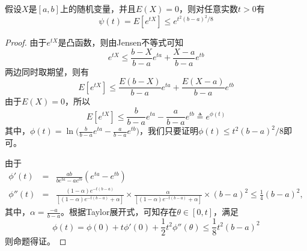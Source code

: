 \begin{lemma}[Hoeffding法则]
假设$X$是$[a,b]$上的随机变量，并且$E(X)=0$，则对任意实数$t>0$有
\begin{equation}
   \psi(t) = E[e^{tX}] \le e^{t^2(b-a)^2/8}
\end{equation}
\end{lemma}
\begin{proof}
由于$e^{tX}$是凸函数，则由Jensen不等式可知
\begin{equation}
  e^{tX} \le \frac{b-X}{b-a} e^{ta} + \frac{X-a}{b-a} e^{tb}
\end{equation}
两边同时取期望，则有
\begin{equation}
  E[e^{tX}] \le \frac{E(b-X)}{b-a} e^{ta} + \frac{E(X-a)}{b-a} e^{tb}
\end{equation}
由于$E(X)=0$，所以
\begin{equation}
  E[e^{tX}] \le \frac{b}{b-a} e^{ta} - \frac{a}{b-a} e^{tb} \triangleq e^{\phi(t)}
\end{equation}
其中，$\phi(t)=\ln\big(\frac{b}{b-a} e^{ta} - \frac{a}{b-a} e^{tb}\big)$，我们只要证明$\phi(t)\le t^2(b-a)^2/8$即可。

由于
\begin{eqnarray}
    \phi'(t) &=& \frac{ab}{b e^{ta} - a e^{tb}} (e^{ta} - e^{tb}) \\
    \phi''(t) &=& \frac{(1-\alpha) e^{-t(b-a)}}{[(1-\alpha) e^{-t(b-a)} + \alpha]} \times \frac{\alpha}{[(1-\alpha) e^{-t(b-a)} + \alpha]} \times (b-a)^2 \le \frac{1}{4} (b-a)^2,
    \end{eqnarray}
其中，$\alpha=\frac{-a}{b-a}$。根据Taylor展开式，可知存在$\theta\in[0,t]$，满足
\begin{equation}
  \phi(t) = \phi(0) + t\phi'(0) + \frac{1}{2} t^2 \phi''(\theta) \le \frac{1}{8} t^2(b-a)^2
\end{equation}
则命题得证。
\end{proof}

